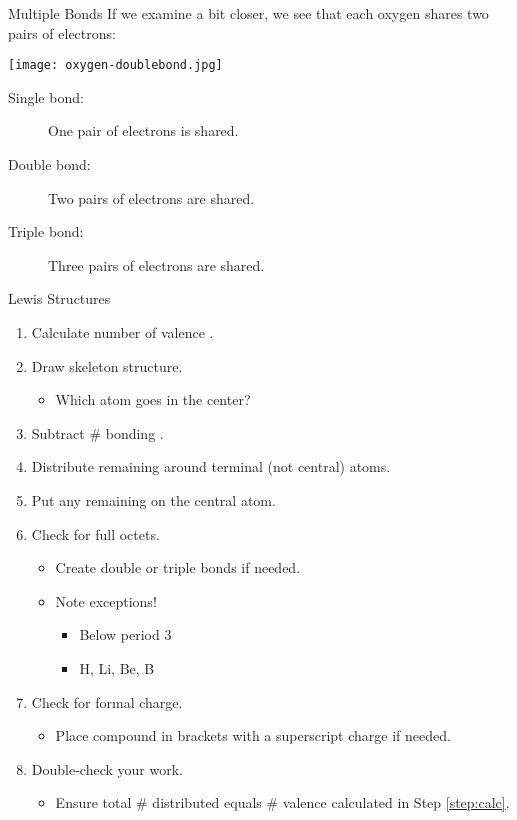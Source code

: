 \documentclass[notes=onlyslideswithnotes,notes=hide]{beamer}
\begin{document}
\begin{frame}{Multiple Bonds}
	If we examine  a bit closer, we see that each oxygen shares
	\alert{two pairs} of electrons:

	\begin{center}
		\texttt{[image: oxygen-doublebond.jpg]}
	\end{center}
	
	\begin{description}
		\item[Single bond:] One pair of electrons is shared.
		\item[Double bond:] Two pairs of electrons are shared.
		\item[Triple bond:] Three pairs of electrons are shared.
	\end{description}

%
\end{frame}

\begin{frame}[t]{Lewis Structures}
	\begin{enumerate}[<+->]
		\item \label{step:calc} Calculate number of valence \el{}.
		\item Draw skeleton structure.
			\begin{itemize}[<only@.>]
				\item Which atom goes in the center?
			\end{itemize}
		\item Subtract \# bonding \el{}.
		\item Distribute remaining \el{} around terminal (not central)
			atoms.
		\item Put any remaining \el{} on the central atom.
		\item Check for full octets.
			\begin{itemize}[<only@.>]
				\item Create double or triple bonds if needed.
				\item Note exceptions!
					\begin{itemize}
						\item Below period 3
						\item H, Li, Be, B
					\end{itemize}
			\end{itemize}
		\item Check for formal charge.
			\begin{itemize}[<only@.>]
				\item Place compound in brackets with a
					superscript charge if needed.
			\end{itemize}
		\item Double-check your work.
			\begin{itemize}[<only@.>]
				\item Ensure total \# \el{} distributed equals
					\# valence \el{} calculated in Step
					\ref{step:calc}.
			\end{itemize}
	\end{enumerate}
\end{frame}
\end{document}
